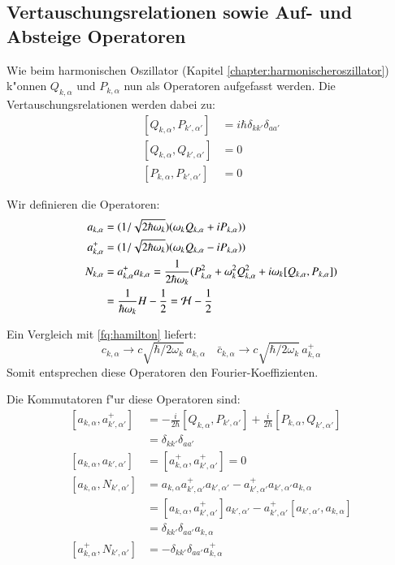\subsection{Vertauschungsrelationen sowie Auf- und Absteige Operatoren}
Wie beim harmonischen Oszillator (Kapitel \ref{chapter:harmonischeroszillator}) k"onnen $Q_{k,\alpha}$ und $P_{k,\alpha}$ nun als Operatoren aufgefasst werden. Die Vertauschungsrelationen werden dabei zu:
\begin{equation}
\begin{split}
[Q_{k,\alpha}, P_{k',\alpha'}] &= i \hbar \delta_{kk'}\delta_{aa'} \\
[Q_{k,\alpha}, Q_{k',\alpha'}] &= 0 \\
[P_{k,\alpha}, P_{k',\alpha'}] &= 0
\end{split}
\end{equation}

Wir definieren die Operatoren:
\begin{equation}
\begin{split}
a_{k,\alpha} &= (1/\sqrt{2 \hbar \omega_k})(\omega_k Q_{k,\alpha} + iP_{k,\alpha})) \\
a^+_{k,\alpha} &= (1/\sqrt{2 \hbar \omega_k})(\omega_k Q_{k,\alpha} - iP_{k,\alpha}))\\
N_{k,\alpha} &= a^+_{k,\alpha} a_{k,\alpha} = \frac{1}{2 \hbar \omega_k} (P_{k,\alpha}^2 + \omega_k^2 Q_{k,\alpha}^2 + i\omega_k [Q_{k,\alpha},P_{k,\alpha}] ) \\
 &= \frac{1}{ \hbar \omega_k } H - \frac{1}{2} = {\cal H} - \frac{1}{2}
\end{split}
\end{equation}

Ein Vergleich mit \ref{fq:hamilton} liefert:
\begin{equation} \label{fq:opp_fourier}
 c_{k,\alpha} \rightarrow c \sqrt{\hbar/2 \omega_k} \, a_{k,\alpha} \quad \bar{c}_{k,\alpha} \rightarrow c \sqrt{\hbar/2 \omega_k} \, a^+_{k,\alpha}
\end{equation}
Somit entsprechen diese Operatoren den Fourier-Koeffizienten.

Die Kommutatoren f"ur diese Operatoren sind:
\begin{equation}
\begin{split}
[a_{k,\alpha} , a^+_{k',\alpha'}] &= - \frac{i}{2 \hbar} [Q_{k,\alpha}, P_{k',\alpha'}] + \frac{i}{2 \hbar} [P_{k,\alpha}, Q_{k',\alpha'}] \\
	 &= \delta_{kk'}\delta_{aa'} \\
[a_{k,\alpha} , a_{k',\alpha'}] &= [a^+_{k,\alpha} , a^+_{k',\alpha'}] = 0 \\
[a_{k,\alpha} , N_{k',\alpha'}] &= a_{k,\alpha} a^+_{k',\alpha'} a_{k',\alpha'} - a^+_{k',\alpha'} a_{k',\alpha'} a_{k,\alpha} \\
	&= [a_{k,\alpha} , a^+_{k',\alpha'}]a_{k',\alpha'} - a^+_{k',\alpha'}[a_{k',\alpha'} , a_{k,\alpha}]\\
	&= \delta_{kk'}\delta_{aa'} a_{k,\alpha} \\
[a^+_{k,\alpha} , N_{k',\alpha'}] &= -\delta_{kk'}\delta_{aa'} a^+_{k,\alpha}
\end{split}
\end{equation}

